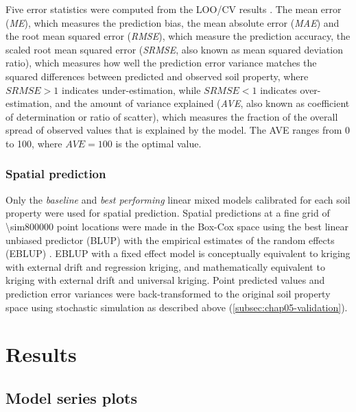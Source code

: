 Five error statistics were computed from the LOO\-/CV results \cite{JanssenEtAl1995, KempenEtAl2010, 
BrusEtAl2011}. The mean error (\textit{ME}), which measures the prediction bias, the mean absolute error 
(\textit{MAE}) and the root mean squared error (\textit{RMSE}), which measure the prediction accuracy, the 
scaled root mean squared error (\textit{SRMSE}, also known as mean squared deviation ratio), which measures how 
well the prediction error variance matches the squared differences between predicted and observed soil 
property, where $\textit{SRMSE} > 1$ indicates under-estimation, while $\textit{SRMSE} < 1$ indicates 
over-estimation, and the amount of variance explained (\textit{AVE}, also known as coefficient of determination 
or ratio of scatter), which measures the fraction of the overall spread of observed values that is explained by 
the model. The AVE ranges from \num{0} to \num{100}, where $\textit{AVE} = 100$ is the optimal value.

\subsubsection*{Spatial prediction}
\label{subsec:chap05-prediction}

Only the \emph{baseline} and \emph{best performing} linear mixed models calibrated for each soil property were 
used for spatial prediction. Spatial predictions at a fine grid of \num{\sim800000} point locations were made 
in the Box-Cox space using the best linear unbiased predictor (BLUP) with the empirical estimates of the random 
effects (EBLUP) \cite{LarkEtAl2006}. EBLUP with a fixed effect model is conceptually equivalent to kriging with 
external drift and regression kriging, and mathematically equivalent to kriging with external drift and 
universal kriging. Point predicted values and prediction error variances were back-transformed to the original 
soil property space using stochastic simulation as described above (\autoref{subsec:chap05-validation}).

\section{Results}
\label{sec:chap05-results}

\subsection{Model series plots}


